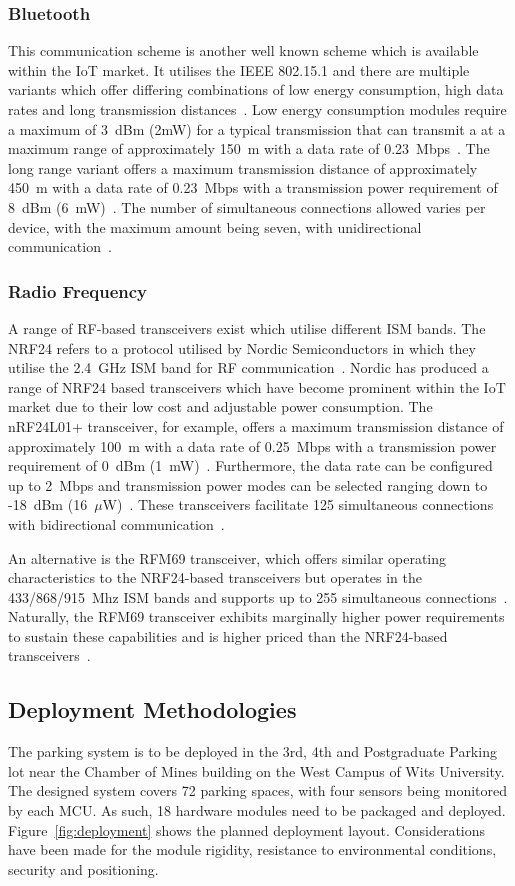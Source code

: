 \documentclass[10pt,twocolumn]{witseiepaper}
\begin{document}
		\subsubsection{Bluetooth}
			This communication scheme is another well known scheme which is available within the IoT market. It utilises the IEEE 802.15.1 and there are multiple variants which offer differing combinations of low energy consumption, high data rates and long transmission distances~\cite{802.15.2}. Low energy consumption modules require a maximum of 3~dBm (2mW) for a typical transmission that can transmit a at a maximum range of approximately 150~m with a data rate of 0.23~Mbps~\cite{BLE112}. The long range variant offers a maximum transmission distance of approximately 450~m with a data rate of 0.23~Mbps with a transmission power requirement of 8~dBm (6~mW)~\cite{BLE112LR}. The number of simultaneous connections allowed varies per device, with the maximum amount being seven, with unidirectional communication~\cite{bluetooth-users}.

		\subsubsection{Radio Frequency}
			A range of RF-based transceivers exist which utilise different ISM bands. The NRF24 refers to a protocol utilised by Nordic Semiconductors in which they utilise the 2.4~GHz ISM band for RF communication~\cite{nrf24}. Nordic has produced a range of NRF24 based transceivers which have become prominent within the IoT market due to their low cost and adjustable power consumption. The nRF24L01+ transceiver, for example, offers a maximum transmission distance of approximately 100~m with a data rate of 0.25~Mbps with a transmission power requirement of 0~dBm (1~mW)~\cite{nrf24}. Furthermore, the data rate can be configured up to 2~Mbps and transmission power modes can be selected ranging down to -18~dBm (16~$\mu$W)~\cite{nrf24}. These transceivers facilitate 125 simultaneous connections with bidirectional communication~\cite{nrf24}.
			
			An alternative is the RFM69 transceiver, which offers similar operating characteristics to the NRF24-based transceivers but operates in the 433/868/915~Mhz ISM bands and supports up to 255 simultaneous connections~\cite{rfm69}. Naturally, the RFM69 transceiver exhibits marginally higher power requirements to sustain these capabilities and is higher priced than the NRF24-based transceivers~\cite{rfm69}.
	
	\subsection{Deployment Methodologies}
		The parking system is to be deployed in the 3rd, 4th and Postgraduate Parking lot near the Chamber of Mines building on the West Campus of Wits University. The designed system covers 72 parking spaces, with four sensors being monitored by each MCU. As such, 18 hardware modules need to be packaged and deployed. Figure~\ref{fig:deployment} shows the planned deployment layout. Considerations have been made for the module rigidity, resistance to environmental conditions, security and positioning.
		
\end{document}

